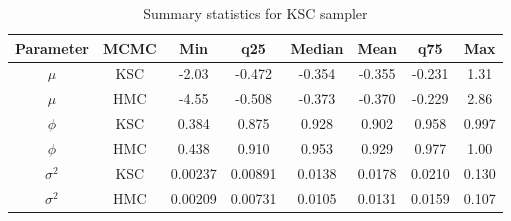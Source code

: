 \documentclass{article}
\begin{document}
\begin{table}
    \centering
    \begin{tabular}{|c|c|c|c|c|c|c|c|} \hline 
    Parameter&  MCMC&Min& q25&  Median& Mean & q75&Max\\ \hline 
    $\mu$&  KSC&-2.03 & -0.472 & -0.354 & -0.355 & -0.231 & 1.31 \\
 $\mu$&  HMC&-4.55 & -0.508 & -0.373 & -0.370 & -0.229 &2.86  \\\hline 
 $\phi$&  KSC&0.384 & 0.875 & 0.928 & 0.902 & 0.958 & 0.997 \\
 $\phi$&  HMC&0.438 & 0.910 & 0.953 & 0.929 & 0.977 &1.00  \\ \hline 
 $\sigma^2$&  KSC&0.00237 & 0.00891 & 0.0138 & 0.0178 & 0.0210 & 0.130 \\ 
 $\sigma^2$&  HMC&0.00209 & 0.00731 & 0.0105 & 0.0131 & 0.0159 &0.107 \\ \hline
    \end{tabular}
    \caption{Summary statistics for KSC sampler}
    \label{tab:kscex}
\end{table}
\end{document}
